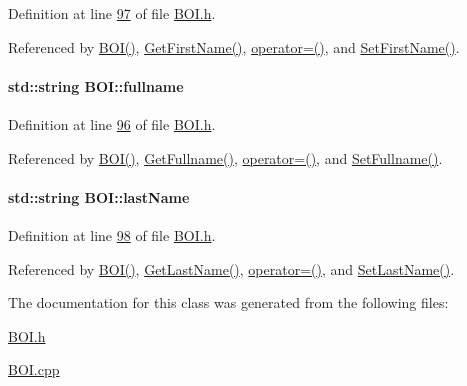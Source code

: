 Definition at line \hyperlink{_b_o_i_8h_source_l00097}{97} of file \hyperlink{_b_o_i_8h_source}{B\+O\+I.\+h}.



Referenced by \hyperlink{_b_o_i_8h_source_l00024}{B\+O\+I()}, \hyperlink{_b_o_i_8cpp_source_l00094}{Get\+First\+Name()}, \hyperlink{_b_o_i_8h_source_l00065}{operator=()}, and \hyperlink{_b_o_i_8cpp_source_l00090}{Set\+First\+Name()}.

\paragraph[{\texorpdfstring{fullname}{fullname}}]{\setlength{\rightskip}{0pt plus 5cm}std\+::string B\+O\+I\+::fullname\hspace{0.3cm}{\ttfamily [private]}}\hypertarget{class_b_o_i_a6d7c892a54bb6f7327cdc777081ab5f4_a6d7c892a54bb6f7327cdc777081ab5f4}{}\label{class_b_o_i_a6d7c892a54bb6f7327cdc777081ab5f4_a6d7c892a54bb6f7327cdc777081ab5f4}


Definition at line \hyperlink{_b_o_i_8h_source_l00096}{96} of file \hyperlink{_b_o_i_8h_source}{B\+O\+I.\+h}.



Referenced by \hyperlink{_b_o_i_8h_source_l00024}{B\+O\+I()}, \hyperlink{_b_o_i_8cpp_source_l00102}{Get\+Fullname()}, \hyperlink{_b_o_i_8h_source_l00065}{operator=()}, and \hyperlink{_b_o_i_8cpp_source_l00098}{Set\+Fullname()}.

\paragraph[{\texorpdfstring{last\+Name}{lastName}}]{\setlength{\rightskip}{0pt plus 5cm}std\+::string B\+O\+I\+::last\+Name\hspace{0.3cm}{\ttfamily [private]}}\hypertarget{class_b_o_i_ad51bfa6f28816c7f5036447ff809cecf_ad51bfa6f28816c7f5036447ff809cecf}{}\label{class_b_o_i_ad51bfa6f28816c7f5036447ff809cecf_ad51bfa6f28816c7f5036447ff809cecf}


Definition at line \hyperlink{_b_o_i_8h_source_l00098}{98} of file \hyperlink{_b_o_i_8h_source}{B\+O\+I.\+h}.



Referenced by \hyperlink{_b_o_i_8h_source_l00024}{B\+O\+I()}, \hyperlink{_b_o_i_8cpp_source_l00086}{Get\+Last\+Name()}, \hyperlink{_b_o_i_8h_source_l00065}{operator=()}, and \hyperlink{_b_o_i_8cpp_source_l00082}{Set\+Last\+Name()}.



The documentation for this class was generated from the following files\+:\begin{DoxyCompactItemize}
\item 
\hyperlink{_b_o_i_8h}{B\+O\+I.\+h}\item 
\hyperlink{_b_o_i_8cpp}{B\+O\+I.\+cpp}\end{DoxyCompactItemize}
